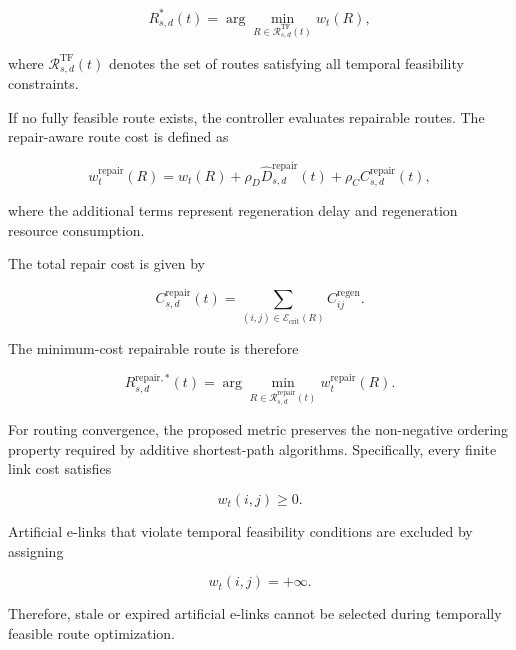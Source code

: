 \begin{equation}
    R_{s,d}^{*}(t)
    =
    \arg\min_{
    R
    \in
    \mathcal{R}_{s,d}^{\mathrm{TF}}(t)
    }
    w_t(R),
\end{equation}

where $\mathcal{R}_{s,d}^{\mathrm{TF}}(t)$ denotes the set of routes satisfying all temporal feasibility constraints.

If no fully feasible route exists, the controller evaluates repairable routes. The repair-aware route cost is defined as

\begin{equation}
    w_t^{\mathrm{repair}}(R)
    =
    w_t(R)
    +
    \rho_D
    \widehat{D}_{s,d}^{\mathrm{repair}}(t)
    +
    \rho_C
    C_{s,d}^{\mathrm{repair}}(t),
\end{equation}

where the additional terms represent regeneration delay and regeneration resource consumption.

The total repair cost is given by

\begin{equation}
    C_{s,d}^{\mathrm{repair}}(t)
    =
    \sum_{
    (i,j)
    \in
    \mathcal{E}_{\mathrm{crit}}(R)
    }
    C_{ij}^{\mathrm{regen}}.
\end{equation}

The minimum-cost repairable route is therefore

\begin{equation}
    R_{s,d}^{\mathrm{repair},*}(t)
    =
    \arg\min_{
    R
    \in
    \mathcal{R}_{s,d}^{\mathrm{repair}}(t)
    }
    w_t^{\mathrm{repair}}(R).
\end{equation}

For routing convergence, the proposed metric preserves the non-negative ordering property required by additive shortest-path algorithms. Specifically, every finite link cost satisfies

\begin{equation}
    w_t(i,j)
    \geq
    0.
\end{equation}

Artificial e-links that violate temporal feasibility conditions are excluded by assigning

\begin{equation}
    w_t(i,j)
    =
    +\infty .
\end{equation}

Therefore, stale or expired artificial e-links cannot be selected during temporally feasible route optimization.

